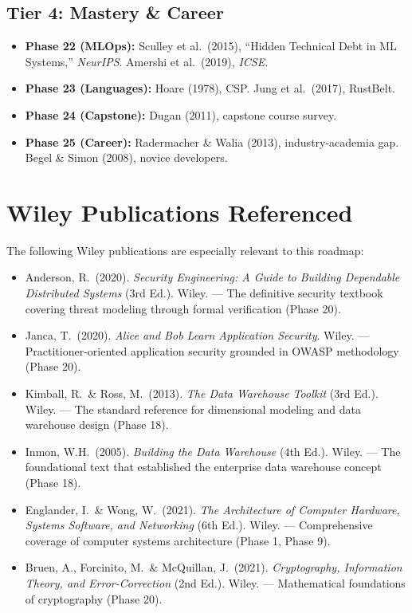 \documentclass[11pt, a4paper, oneside]{report}
\begin{document}
{{{{{{{{{{{{\subsection*{Tier 4: Mastery \& Career}
\begin{itemize}[leftmargin=*]
\item \textbf{Phase 22 (MLOps):} Sculley et al.\ (2015), ``Hidden Technical Debt in ML Systems,'' \emph{NeurIPS}. Amershi et al.\ (2019), \emph{ICSE}.
\item \textbf{Phase 23 (Languages):} Hoare (1978), CSP. Jung et al.\ (2017), RustBelt.
\item \textbf{Phase 24 (Capstone):} Dugan (2011), capstone course survey.
\item \textbf{Phase 25 (Career):} Radermacher \& Walia (2013), industry-academia gap. Begel \& Simon (2008), novice developers.
\end{itemize}

\section*{Wiley Publications Referenced}

The following Wiley publications are especially relevant to this roadmap:

\begin{itemize}[leftmargin=*]
\item Anderson, R.\ (2020). \emph{Security Engineering: A Guide to Building Dependable Distributed Systems} (3rd Ed.). Wiley. --- The definitive security textbook covering threat modeling through formal verification (Phase 20).
\item Janca, T.\ (2020). \emph{Alice and Bob Learn Application Security}. Wiley. --- Practitioner-oriented application security grounded in OWASP methodology (Phase 20).
\item Kimball, R.\ \& Ross, M.\ (2013). \emph{The Data Warehouse Toolkit} (3rd Ed.). Wiley. --- The standard reference for dimensional modeling and data warehouse design (Phase 18).
\item Inmon, W.H.\ (2005). \emph{Building the Data Warehouse} (4th Ed.). Wiley. --- The foundational text that established the enterprise data warehouse concept (Phase 18).
\item Englander, I.\ \& Wong, W.\ (2021). \emph{The Architecture of Computer Hardware, Systems Software, and Networking} (6th Ed.). Wiley. --- Comprehensive coverage of computer systems architecture (Phase 1, Phase 9).
\item Bruen, A., Forcinito, M.\ \& McQuillan, J.\ (2021). \emph{Cryptography, Information Theory, and Error-Correction} (2nd Ed.). Wiley. --- Mathematical foundations of cryptography (Phase 20).
\end{itemize}

}}}}}}}}}}}}
\end{document}
